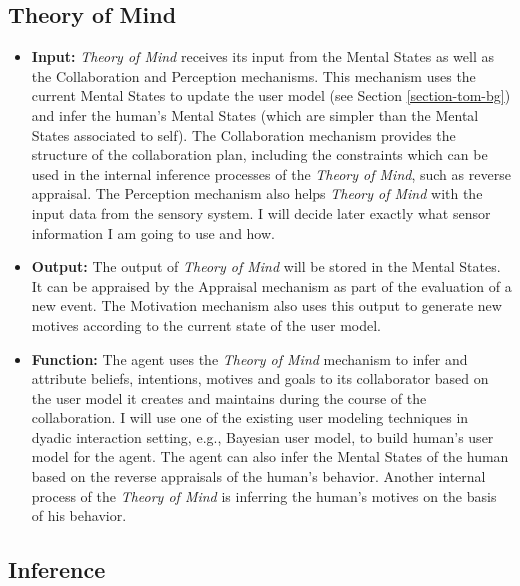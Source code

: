 \documentclass[12pt]{report}
\begin{document}
\subsection{Theory of Mind}

\begin{itemize}
  \item \textbf{Input:} \textit{Theory of Mind} receives its input from the
  Mental States as well as the Collaboration and Perception mechanisms. This
  mechanism uses the current Mental States to update the user model (see Section
  \ref{section-tom-bg}) and infer the human's Mental States (which are simpler
  than the Mental States associated to self). The Collaboration mechanism
  provides the structure of the collaboration plan, including the constraints
  which can be used in the internal inference processes of the \textit{Theory of
  Mind}, such as reverse appraisal. The Perception mechanism also helps
  \textit{Theory of Mind} with the input data from the sensory system. I will
  decide later exactly what sensor information I am going to use and how.
  
  \item \textbf{Output:} The output of \textit{Theory of Mind} will be stored in
  the Mental States. It can be appraised by the Appraisal mechanism as part of the
  evaluation of a new event. The Motivation mechanism also uses this output to
  generate new motives according to the current state of the user model.
  
  \item \textbf{Function:} The agent uses the \textit{Theory of Mind} mechanism
  to infer and attribute beliefs, intentions, motives and goals to its
  collaborator based on the user model it creates and maintains during the
  course of the collaboration. I will use one of the existing user modeling
  techniques in dyadic interaction setting, e.g., Bayesian user model, to build
  human's user model for the agent. The agent can also infer the Mental States
  of the human based on the reverse appraisals of the human's behavior. Another
  internal process of the \textit{Theory of Mind} is inferring the human's
  motives on the basis of his behavior.
\end{itemize}

\subsection{Inference}
\end{document}
